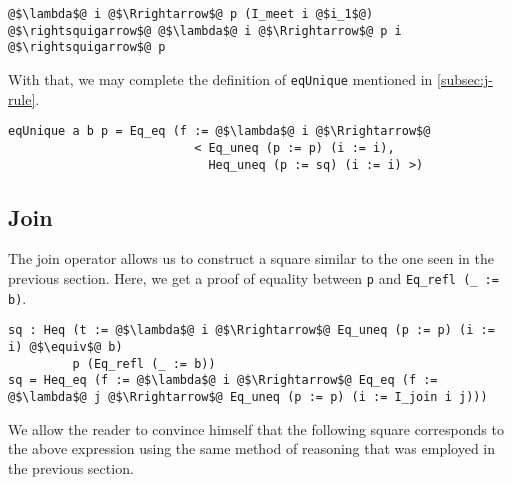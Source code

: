 \documentclass[12pt,twoside,maitrise]{dms}
\theoremstyle{definition}
\numberwithin{equation}{section}
\numberwithin{table}{chapter}
\numberwithin{figure}{chapter}
\newcommand\id[1] {\texttt{#1}}
\newcommand\fn[1] {\texttt{#1}}
\begin{document}
\begin{verbatim}
@$\lambda$@ i @$\Rrightarrow$@ p (I_meet i @$i_1$@)
@$\rightsquigarrow$@ @$\lambda$@ i @$\Rrightarrow$@ p i
@$\rightsquigarrow$@ p
\end{verbatim}

With that, we may complete the definition of \id{eqUnique} mentioned in
\autoref{subsec:j-rule}.

\begin{verbatim}
eqUnique a b p = Eq_eq (f := @$\lambda$@ i @$\Rrightarrow$@
                          < Eq_uneq (p := p) (i := i),
                            Heq_uneq (p := sq) (i := i) >)
\end{verbatim}


\subsection*{Join}

The join operator allows us to construct a square similar to the one seen in the
previous section. Here, we get a proof of equality between \id{p} and \fn{Eq_refl
  (_ := b)}.

\begin{verbatim}
sq : Heq (t := @$\lambda$@ i @$\Rrightarrow$@ Eq_uneq (p := p) (i := i) @$\equiv$@ b)
         p (Eq_refl (_ := b))
sq = Heq_eq (f := @$\lambda$@ i @$\Rrightarrow$@ Eq_eq (f := @$\lambda$@ j @$\Rrightarrow$@ Eq_uneq (p := p) (i := I_join i j)))
\end{verbatim}

We allow the reader to convince himself that the following square corresponds to
the above expression using the same method of reasoning that was employed in the
previous section.
\end{document}
